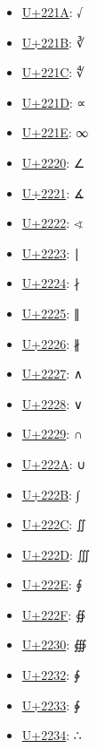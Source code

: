 \begin{itemize}
	\item \href{https://www.compart.com/en/unicode/U+221A}{U+221A}: √
	\item \href{https://www.compart.com/en/unicode/U+221B}{U+221B}: ∛
	\item \href{https://www.compart.com/en/unicode/U+221C}{U+221C}: ∜
	\item \href{https://www.compart.com/en/unicode/U+221D}{U+221D}: ∝
	\item \href{https://www.compart.com/en/unicode/U+221E}{U+221E}: ∞
	\item \href{https://www.compart.com/en/unicode/U+2220}{U+2220}: ∠
	\item \href{https://www.compart.com/en/unicode/U+2221}{U+2221}: ∡
	\item \href{https://www.compart.com/en/unicode/U+2222}{U+2222}: ∢
	\item \href{https://www.compart.com/en/unicode/U+2223}{U+2223}: ∣
	\item \href{https://www.compart.com/en/unicode/U+2224}{U+2224}: ∤
	\item \href{https://www.compart.com/en/unicode/U+2225}{U+2225}: ∥
	\item \href{https://www.compart.com/en/unicode/U+2226}{U+2226}: ∦
	\item \href{https://www.compart.com/en/unicode/U+2227}{U+2227}: ∧
	\item \href{https://www.compart.com/en/unicode/U+2228}{U+2228}: ∨
	\item \href{https://www.compart.com/en/unicode/U+2229}{U+2229}: ∩
	\item \href{https://www.compart.com/en/unicode/U+222A}{U+222A}: ∪
	\item \href{https://www.compart.com/en/unicode/U+222B}{U+222B}: ∫
	\item \href{https://www.compart.com/en/unicode/U+222C}{U+222C}: ∬
	\item \href{https://www.compart.com/en/unicode/U+222D}{U+222D}: ∭
	\item \href{https://www.compart.com/en/unicode/U+222E}{U+222E}: ∮
	\item \href{https://www.compart.com/en/unicode/U+222F}{U+222F}: ∯
	\item \href{https://www.compart.com/en/unicode/U+2230}{U+2230}: ∰
	\item \href{https://www.compart.com/en/unicode/U+2232}{U+2232}: ∲
	\item \href{https://www.compart.com/en/unicode/U+2233}{U+2233}: ∳
	\item \href{https://www.compart.com/en/unicode/U+2234}{U+2234}: ∴

\end{itemize}
